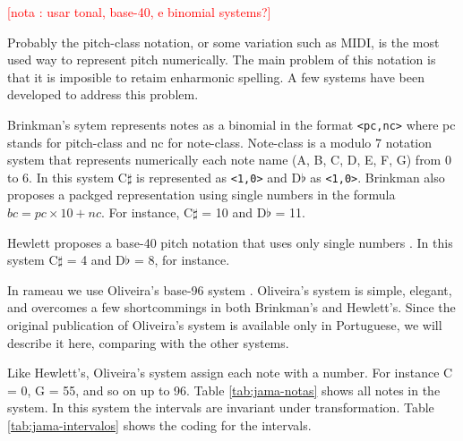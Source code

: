 \documentclass{article}
\newcounter{notacounter}
\newcommand{\nota}[1]{
  \addtocounter{notacounter}{1}
  \textcolor{red}{[nota \arabic{notacounter}: #1]}
}
\begin{document}
\nota{usar tonal, base-40, e binomial systems?}

Probably the pitch-class notation, or some variation such as MIDI, is
the most used way to represent pitch numerically. The main problem of
this notation is that it is imposible to retaim enharmonic spelling. A
few systems have been developed to address this problem. 

Brinkman's sytem \cite{brinkman86:_binom_repres_of_pitch_for}
represents notes as a binomial in the format \texttt{<pc,nc>} where pc
stands for pitch-class and nc for note-class. Note-class is a modulo 7
notation system that represents numerically each note name (A, B, C,
D, E, F, G) from 0 to 6. In this system C$\sharp$ is represented as
\texttt{<1,0>} and D$\flat$ as \texttt{<1,0>}. Brinkman also proposes
a packged representation using single numbers in the formula $bc =
pc\times10 + nc$. For instance, C$\sharp$ = 10 and D$\flat$ = 11.

Hewlett proposes a base-40 pitch notation that uses only single
numbers \cite{hewlett92:base40}. In this system C$\sharp$ = 4 and
D$\flat$ = 8, for instance.

In rameau we use Oliveira's base-96 system
\cite{oliveira01:codificacao}. Oliveira's system is simple, elegant,
and overcomes a few shortcommings in both Brinkman's and Hewlett's.
Since the original publication of Oliveira's system is available only
in Portuguese, we will describe it here, comparing with the other
systems.

Like Hewlett's, Oliveira's system assign each note with a number. For
instance C = 0, G = 55, and so on up to 96. Table
\ref{tab:jama-notas} shows all notes in the system. In this system the
intervals are invariant under transformation. Table
\ref{tab:jama-intervalos} shows the coding for the intervals.
\end{document}
